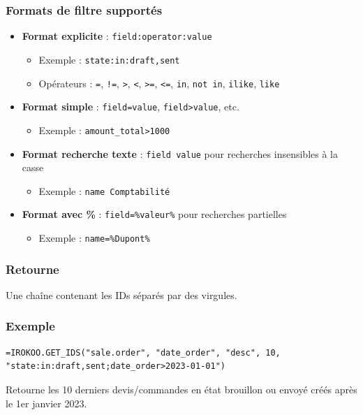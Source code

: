 \documentclass[12pt, a4paper]{article}
\begin{document}
\subsubsection{Formats de filtre supportés}
\begin{itemize}
    \item \textbf{Format explicite} : \texttt{field:operator:value}
    \begin{itemize}
        \item Exemple : \texttt{state:in:draft,sent}
        \item Opérateurs : \texttt{=}, \texttt{!=}, \texttt{>}, \texttt{<}, \texttt{>=}, \texttt{<=}, \texttt{in}, \texttt{not in}, \texttt{ilike}, \texttt{like}
    \end{itemize}
    \item \textbf{Format simple} : \texttt{field=value}, \texttt{field>value}, etc.
    \begin{itemize}
        \item Exemple : \texttt{amount\_total>1000}
    \end{itemize}
    \item \textbf{Format recherche texte} : \texttt{field~value} pour recherches insensibles à la casse
    \begin{itemize}
        \item Exemple : \texttt{name~Comptabilité}
    \end{itemize}
    \item \textbf{Format avec \%} : \texttt{field=\%valeur\%} pour recherches partielles
    \begin{itemize}
        \item Exemple : \texttt{name=\%Dupont\%}
    \end{itemize}
\end{itemize}

\subsubsection{Retourne}
Une chaîne contenant les IDs séparés par des virgules.

\subsubsection{Exemple}
\begin{lstlisting}
=IROKOO.GET_IDS("sale.order", "date_order", "desc", 10, "state:in:draft,sent;date_order>2023-01-01")
\end{lstlisting}
Retourne les 10 derniers devis/commandes en état brouillon ou envoyé créés après le 1er janvier 2023.
\end{document}
